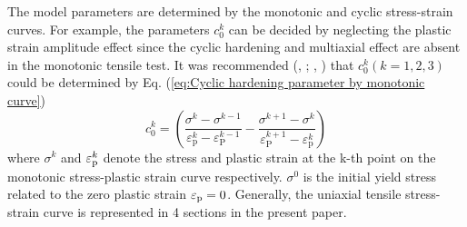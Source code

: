 \documentclass[preprint,5p,twocolumn,10pt,sort&compress]{elsarticle}
\begin{document}
The model parameters are determined by the monotonic and cyclic stress-strain curves. For example, the parameters $c_{0}^{k}$ can be decided by neglecting the plastic strain amplitude effect since the cyclic hardening and multiaxial effect are absent in the monotonic tensile test. It was recommended (\citeauthor{Jiang1996Characteristics}, \citeyear{Jiang1996Characteristics}; \citeauthor{Jiang1996Modeling}, \citeyear{Jiang1996Modeling}) that $c_{0}^{k}\left  ( k=1,2,3 \right )$ could be determined by Eq. (\ref{eq:Cyclic hardening parameter by monotonic curve})
\begin{equation}\label{eq:Cyclic hardening parameter by monotonic curve}
c_{0}^{k}=\left (\frac{\sigma^{k}-\sigma^{k-1}}{\varepsilon_{\mathrm{p}}^{k}-\varepsilon_{\mathrm{P}}^{k-1}}
-\frac{\sigma^{k+1}-\sigma^{k}}{\varepsilon_{\mathrm{P}}^{k+1}-\varepsilon_{\mathrm{p}}^{k}}\right)
\end{equation}
where $\sigma^{k}$ and $\varepsilon_{\rm p}^{k}$ denote the stress and plastic strain at the k-th point on the monotonic stress-plastic strain curve respectively. $\sigma^{0}$ is the initial yield stress related to the zero plastic strain $\varepsilon_{\rm p} = 0$. Generally, the uniaxial tensile stress-strain curve is represented in 4 sections in the present paper.
\end{document}
